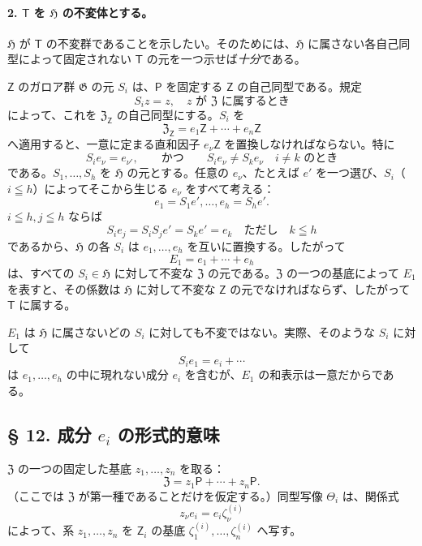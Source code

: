 \paragraph{2. $\mathsf T$ を $\mathfrak H$ の不変体とする。}
$\mathfrak H$ が $\mathsf T$ の不変群であることを示したい。そのためには、$\mathfrak H$ に属さない各自己同型によって固定されない $\mathsf T$ の元を一つ示せば\emph{十分}である。

$\mathsf Z$ のガロア群 $\mathfrak G$ の元 $S_i$ は、$\mathsf P$ を固定する $\mathsf Z$ の自己同型である。規定
\[
S_i z=z,\quad \text{$z$ が $\mathfrak Z$ に属するとき}
\]
によって、これを $\mathfrak Z_{\mathsf Z}$ の自己同型にする。$S_i$ を
\[
\mathfrak Z_{\mathsf Z}=e_1\mathsf Z+\cdots+e_n\mathsf Z
\]
へ適用すると、一意に定まる直和因子 $e_\nu\mathsf Z$ を置換しなければならない。特に
\[
S_i e_\nu=e_{\nu'},\qquad\text{かつ}\qquad S_i e_\nu\ne S_k e_\nu
\quad\text{$i\ne k$ のとき}
\]
である。$S_1,\ldots,S_h$ を $\mathfrak H$ の元とする。任意の $e_\nu$、たとえば $e'$ を一つ選び、$S_i$（$i\leqq h$）によってそこから生じる $e_\nu$ をすべて考える：
\[
e_1=S_1e',\ldots,e_h=S_he'.
\]
$i\leqq h,j\leqq h$ ならば
\[
S_i e_j=S_iS_j e'=S_ke'=e_k \quad \text{ただし}\quad k\leqq h
\]
であるから、$\mathfrak H$ の各 $S_i$ は $e_1,\ldots,e_h$ を互いに置換する。したがって
\[
E_1=e_1+\cdots+e_h
\]
は、すべての $S_i\in\mathfrak H$ に対して不変な $\mathfrak Z$ の元である。$\mathfrak Z$ の一つの基底によって $E_1$ を表すと、その係数は $\mathfrak H$ に対して不変な $\mathsf Z$ の元でなければならず、したがって $\mathsf T$ に属する。

$E_1$ は $\mathfrak H$ に属さないどの $S_i$ に対しても不変ではない。実際、そのような $S_i$ に対して
\[
S_i e_1=e_i+\cdots
\]
は $e_1,\ldots,e_h$ の中に現れない成分 $e_i$ を含むが、$E_1$ の和表示は一意だからである。

\subsection*{§ 12. 成分 $e_i$ の形式的意味}\label{die-formale-bedeutung-der-komponenten-ei}

$\mathfrak Z$ の一つの固定した基底 $z_1,\ldots,z_n$ を取る：
\[
\mathfrak Z=z_1\mathsf P+\cdots+z_n\mathsf P.
\]
（ここでは $\mathfrak Z$ が第一種であることだけを仮定する。）同型写像 $\Theta_i$ は、関係式
\[
z_\nu e_i=e_i\zeta_\nu^{(i)}
\]
によって、系 $z_1,\ldots,z_n$ を $\mathsf Z_i$ の基底 $\zeta_1^{(i)},\ldots,\zeta_n^{(i)}$ へ写す。

